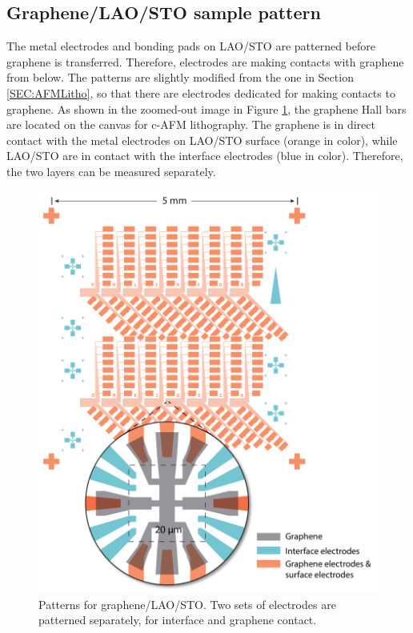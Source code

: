 \documentclass[pdflatex, sectionletters, 12pt]{pittetd}    %
\begin{document}
\subsection{Graphene/LAO/STO sample pattern}

The metal electrodes and bonding pads on LAO/STO are patterned before graphene is transferred. Therefore, electrodes are making contacts with graphene from below. The patterns are slightly modified from the one in Section \ref{SEC:AFMLitho}, so that there are electrodes dedicated for making contacts to graphene. As shown in the zoomed-out image in Figure \ref{FIG:GCO}, the graphene Hall bars are located on the canvas for c-AFM lithography. The graphene is in direct contact with the metal electrodes on LAO/STO surface (orange in color), while LAO/STO are in contact with the interface electrodes (blue in color). Therefore, the two layers can be measured separately. 

\begin{figure}[p]
	\centering
	\includegraphics[width=1\textwidth]{Drawing/GCO.pdf}
	\caption{Patterns for graphene/LAO/STO. Two sets of electrodes are patterned separately, for interface and graphene contact.}
	\label{FIG:GCO}
\end{figure}
\end{document}
